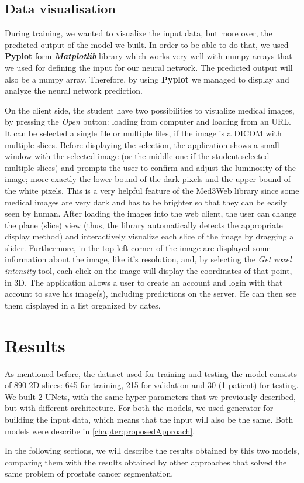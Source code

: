 \documentclass[runningheads,a4paper,11pt]{report}
\begin{document}
\subsection{Data visualisation}
\label{section:data_visualisation}
During training, we wanted to visualize the input data, but more over, the predicted output of the model we built. In order to be able to do that, we used \textbf{Pyplot} form \textbf{\textit{Matplotlib}} library which works very well with numpy arrays that we used for defining the input for our neural network. The predicted output will also be a numpy array. Therefore, by using \textbf{Pyplot} we managed to display and analyze the neural network prediction.\par
On the client side, the student have two possibilities to visualize medical images, by pressing the \emph{Open} button: loading from computer and loading from an URL. It can be selected a single file or multiple files, if the image is a DICOM with multiple slices. Before displaying the selection, the application shows a small window with the selected image (or the middle one if the student selected multiple slices) and prompts the user to confirm and adjust the luminosity of the image; more exactly the lower bound of the dark pixels and the upper bound of the white pixels. This is a very helpful feature of the Med3Web library since some medical images are very dark and has to be brighter so that they can be easily seen by human.
After loading the images into the web client, the user can change the plane (slice) view (thus, the library automatically detects the appropriate display method) and interactively visualize each slice of the image by dragging a slider.
Furthermore, in the top-left corner of the image are displayed some information about the image, like it's resolution, and, by selecting the \emph{Get voxel intensity} tool, each click on the image will display the coordinates of that point, in 3D. The application allows a user to create an account and login with that account to save his image(s), including predictions on the server. He can then see them displayed in a list  organized by dates.
\section{Results}
\label{section:results}

As mentioned before, the dataset used for training and testing the model consists of 890 2D slices: 645 for training, 215 for validation and 30 (1 patient) for testing. We built 2 UNets, with the same hyper-parameters that we previously described, but with different architecture. For both the models, we used generator for building the input data, which means that the input will also be the same. Both models were describe in \ref{chapter:proposedApproach}.\par
In the following sections, we will describe the results obtained by this two models, comparing them with the results obtained by other approaches that solved the same problem of prostate cancer segmentation.
\end{document}

